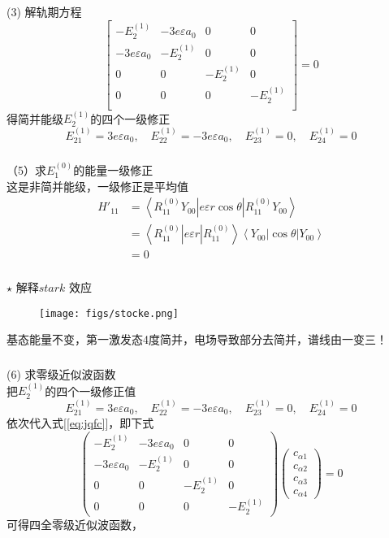 \begin{frame}
  \frametitle{}
(3) 解轨期方程
$$ \begin{bmatrix}
  -E^{(1)}_2 & -3e\varepsilon a_0 & 0 & 0 \\
  -3e\varepsilon a_0 & -E^{(1)}_2 & 0 & 0 \\
  0 & 0 & -E^{(1)}_2 & 0 \\
  0 & 0 & 0 & -E^{(1)}_2 \\  
\end{bmatrix} = 0 $$
得简并能级$E^{(1)}_2$的四个一级修正 
$$E^{(1)}_{21} = 3e\varepsilon a_0, \quad E^{(1)}_{22} = - 3e\varepsilon a_0, \quad E^{(1)}_{23} = 0, \quad E^{(1)}_{24} = 0 $$
\end{frame} 

\begin{frame}
  \frametitle{}
（5）求$E^{(0)}_1 $的能量一级修正 \\
这是非简并能级，一级修正是平均值
$$ 
\begin{aligned}
  H'_{11} &= \left\langle R^{(0)}_{11}Y_{00} 
 \right\vert e \varepsilon r \cos\theta \left\vert R^{(0)}_{11}Y_{00}  \right\rangle  \\ 
 &= \left\langle R^{(0)}_{11} 
 \right\vert e \varepsilon r \left\vert R^{(0)}_{11} \right\rangle   \left\langle Y_{00} 
 \right\vert \cos\theta \left\vert Y_{00}  \right\rangle \\
 &= 0 
\end{aligned}
$$ 
\end{frame} 

\begin{frame}
  \frametitle{}
$\star$ 解释$stark$ 效应
\begin{figure}[htbp]
  \centering
  \texttt{[image: figs/stocke.png]}
\end{figure}
基态能量不变，第一激发态4度简并，电场导致部分去简并，谱线由一变三！
\end{frame} 

\begin{frame}
  \frametitle{}
(6) 求零级近似波函数\\
把$E^{(1)}_2$的四个一级修正值 
$$E^{(1)}_{21} = 3e\varepsilon a_0, \quad E^{(1)}_{22} = - 3e\varepsilon a_0, \quad E^{(1)}_{23} = 0, \quad E^{(1)}_{24} = 0 $$
依次代入式[\ref{eq:jqfc}]，即下式 
\begin{equation*}
  \begin{pmatrix}-E^{(1)}_2 & -3e\varepsilon a_0 & 0 & 0 \\
    -3e\varepsilon a_0 & -E^{(1)}_2 & 0 & 0 \\
    0 & 0 & -E^{(1)}_2 & 0 \\
    0 & 0 & 0 & -E^{(1)}_2 \end{pmatrix}
    \begin{pmatrix}c_{\alpha 1} \\c_{\alpha 2} \\ c_{\alpha 3} \\c_{\alpha 4} \end{pmatrix} =0
\end{equation*}
可得四全零级近似波函数，
\end{frame} 

